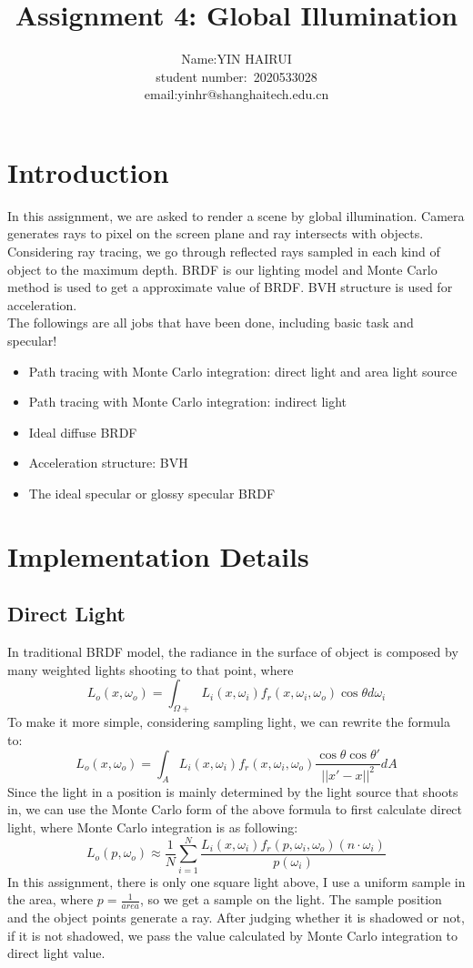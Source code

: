 \documentclass[acmtog]{acmart}
\title{Assignment 4: {Global Illumination}}
\author{Name:\quad YIN HAIRUI  \\ student number:\ 2020533028
\\email:\quad yinhr@shanghaitech.edu.cn}
\begin{document}
\maketitle

\vspace*{2 ex}

\section{Introduction}
In this assignment, we are asked to render a scene by global illumination. Camera generates rays to pixel on the screen plane and ray intersects with objects. Considering ray tracing, we go through reflected rays sampled in each kind of object to the maximum depth. BRDF is our lighting model and Monte Carlo method is used to get a approximate value of BRDF. BVH structure is used for acceleration. \\ The followings are all jobs that have been done, including basic task and specular!
\begin{itemize}
	\item Path tracing with Monte Carlo integration: direct light and area light source
	\item Path tracing with Monte Carlo integration: indirect light
	\item Ideal diffuse BRDF
	\item Acceleration structure: BVH
	\item The ideal specular or glossy specular BRDF
\end{itemize}

\section{Implementation Details}
\subsection{Direct Light}
In traditional BRDF model, the radiance in the surface of object is composed by many weighted lights shooting to that point, where
$$L_o(x,\omega_o)=\int_{\Omega+}L_i(x,\omega_i)f_r(x,\omega_i, \omega_o)\cos{\theta}d\omega_i$$
To make it more simple, considering sampling light, we can rewrite the formula to:
$$L_o(x,\omega_o)=\int_{A}L_i(x,\omega_i)f_r(x,\omega_i, \omega_o)\frac{\cos{\theta}\cos{\theta'}}{||x'-x||^2}dA$$
Since the light in a position is mainly determined by the light source that shoots in, we can use the Monte Carlo form of the above formula to first calculate direct light, where Monte Carlo integration is as following:
$$L_o(p,\omega_o)\approx\frac{1}{N}\sum^N_{i=1}\frac{L_i(x,\omega_i)f_r(p,\omega_i,\omega_o)(n\cdot \omega_i)}{p(\omega_i)}$$
In this assignment, there is only one square light above, I use a uniform sample in the area, where $p=\frac{1}{area}$, so we get a sample on the light. The sample position and the object points generate a ray. After judging whether it is shadowed or not, if it is not shadowed, we pass the value calculated by  Monte Carlo integration to direct light value.
\end{document}
